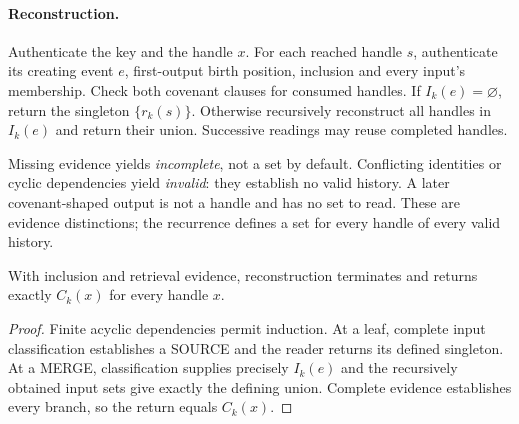 \documentclass[../main.tex]{subfiles}
\begin{document}
\paragraph{Reconstruction.}
Authenticate the key and the handle $x$. For each reached handle $s$,
authenticate its creating event $e$, first-output birth position, inclusion
and every input's membership. Check both covenant clauses for consumed
handles. If $I_k(e)=\varnothing$, return the singleton $\{r_k(s)\}$.
Otherwise recursively reconstruct all handles in $I_k(e)$ and return
their union. Successive readings may reuse completed handles.

Missing evidence yields \emph{incomplete}, not a set by default.
Conflicting identities or cyclic dependencies yield \emph{invalid}: they
establish no valid history. A later covenant-shaped output is not a handle
and has no set to read. These are evidence distinctions; the recurrence defines a set
for every handle of every valid history.

\begin{theorem}
\label{thm:kpc-interface:membership-correctness}
With inclusion and retrieval evidence, reconstruction terminates and
returns exactly $C_k(x)$ for every handle $x$.
\end{theorem}
\begin{proof}
Finite acyclic dependencies permit induction. At a leaf, complete input
classification establishes a SOURCE and the reader returns its defined
singleton. At a MERGE, classification supplies precisely $I_k(e)$ and
the recursively obtained input sets give exactly the defining union.
Complete evidence establishes every branch, so the return equals $C_k(x)$.
\end{proof}
\end{document}
